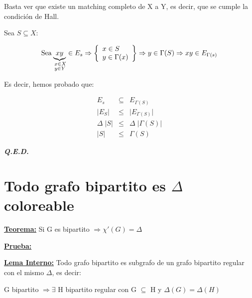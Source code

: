 \documentclass[12pt,a4paper]{report}
\newcommand{\QED}{\hfill \textit{\textbf{Q.E.D.}}}
\begin{document}
			\vspace{3mm}
			\par Basta ver que existe un matching completo de X a Y, es decir, que se cumple la condición de Hall.

			\vspace{5mm}
			\par Sea $S \subseteq X$:

			\begin{equation*}
				\text{Sea}
				\underbrace{xy}_{\begin{subarray}{l} \; x \in X \\
				\; y \in Y \end{subarray}} \in E_{s} \Rightarrow
	  			\left\lbrace
	  			\begin{array}{l}
	    			x \in S \\
	     		  	y \in \Gamma(x) \\
	  			\end{array}
	 			\right\rbrace
	 			\Rightarrow y \in \Gamma(S) \Rightarrow xy \in E_{\Gamma(s)}
			\end{equation*}

			\vspace{3mm}
			\par Es decir, hemos probado que:

			\begin{eqnarray}
				\nonumber E_{s} &\subseteq & E_{\Gamma(S)} \\
				\nonumber \lvert E_{S} \rvert &\leq & \lvert E_{\Gamma(S)} \rvert \\
				\nonumber \Delta \; \lvert S \rvert &\leq & \Delta \; \lvert \Gamma(S) \rvert \\
				\nonumber \lvert S \rvert &\leq & \Gamma(S)
			\end{eqnarray}

		\QED

	\section{Todo grafo bipartito es $\Delta$ coloreable}
		\textbf{\underline{Teorema:}} Si G es bipartito $\Rightarrow \chi '(G) = \Delta $

		\textbf{\underline{Prueba:}}
			
			\vspace{3mm}
			\underline{\textbf{Lema Interno:}} Todo grafo bipartito es subgrafo de un grafo bipartito regular con el mismo $\Delta$, es decir:
				\begin{center}
					G bipartito $\Rightarrow \exists$ H bipartito regular con G $\subseteq$ H y $\Delta(G) = \Delta(H)$
				\end{center}
\end{document}

